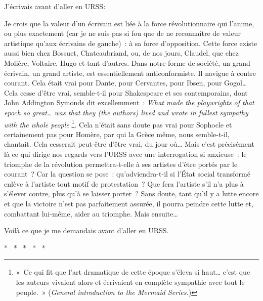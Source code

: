\documentclass[french,twoside]{book} %
\begin{document}
\noindent J’écrivais avant d’aller en URSS:\par
Je crois que la valeur d’un écrivain est liée à la force révolutionnaire qui l’anime, ou plus exactement (car je ne suis pas si fou que de ne reconnaître de valeur artistique qu’aux écrivains de gauche) : à sa force d’opposition. Cette force existe aussi bien chez Bossuet, Chateaubriand, ou, de nos jours, Claudel, que chez Molière, Voltaire, Hugo et tant d’autres. Dans notre forme de société, un grand écrivain, un grand artiste, est essentiellement anticonformiste. Il navigue à contre courant. Cela était vrai pour Dante, pour Cervantes, pour Ibsen, pour Gogol… Cela cesse d’être vrai, semble-t-il pour Shakespeare et ses contemporains, dont John Addington Symonds dit excellemment : \emph{What made the playwrights of that epoch so great… was that they (the authors) lived and wrote in fullest sympathy with the whole people} \footnote{« Ce qui fit que l’art dramatique de cette époque s’éleva si haut… c’est que les auteurs vivaient alors et écrivaient en complète sympathie avec tout le peuple. » (\emph{General introduction to the Mermaid Series.})}. Cela n’était sans doute pas vrai pour Sophocle et certainement pas pour Homère, par qui la Grèce même, nous semble-t-il, chantait. Cela cesserait peut-être d’être vrai, du jour où… Mais c’est précisément là ce qui dirige nos regards vers l’URSS avec une interrogation si anxieuse : le triomphe de la révolution permettra-t-elle à ses artistes d’être portés par le courant ? Car la question se pose : qu’adviendra-t-il si l’État social transformé enlève à l’artiste tout motif de protestation ? Que fera l’artiste s’il n’a plus à s’élever contre, plus qu’à se laisser porter ? Sans doute, tant qu’il y a lutte encore et que la victoire n’est pas parfaitement assurée, il pourra peindre cette lutte et, combattant lui-même, aider au triomphe. Mais ensuite…\par
Voilà ce que je me demandais avant d’aller en URSS.\par

\begin{center}
\noindent \centerline{*  *  *  *  *}\par
\end{center}
\end{document}
